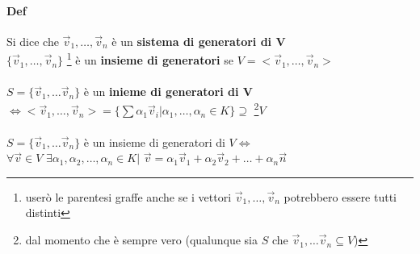 \paragraph{Def} Si dice che $\vec{v}_1,\dots, \vec{v}_n$ è un 
\textbf{sistema di generatori di $\pmb{V}$}\\
$\{\vec{v}_1,\dots, \vec{v}_n\}$ \footnote{
    userò le parentesi graffe anche se i vettori $\vec{v}_1,\dots,\vec{v}_n$
    potrebbero essere tutti distinti
    } è un \textbf{insieme di generatori} 
se $V=<\vec{v}_1,\dots, \vec{v}_n>$
\\\\
$S=\{\vec{v}_1,\dots\vec{v}_n\}$ è un \textbf{inieme di generatori di $\pmb{V}$}\\
$\Longleftrightarrow <\vec{v}_1,\dots,\vec{v}_n>=\{\sum \alpha_1\vec{v}_i| \alpha_1, 
\dots, \alpha_n\in K\}\supseteq$ \footnote{
        dal momento che è sempre vero
        (qualunque sia $S$ che $\vec{v}_1,\dots\vec{v}_n\subseteq V$)
    }$ V$\\\\
{\color{red}
    $S = \{\vec{v}_1,\dots\vec{v}_n\}$ è un insieme di generatori di $V \Longleftrightarrow$\\
    $\forall\vec{v}\in V$  $\exists\alpha_1,\alpha_2, \dots, \alpha_n\in K|$
    $\vec{v}=\alpha_1\vec{v}_1+\alpha_2\vec{v}_2+\dots+\alpha_n\vec{n}$
}
